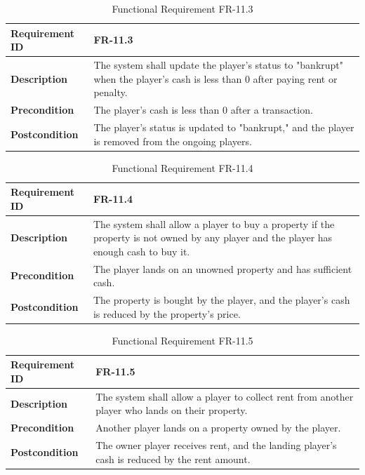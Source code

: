 \documentclass{article}
\begin{document}
\begin{table}[ht]
    \centering
    \caption{Functional Requirement FR-11.3}
    \begin{tabular}{@{}P{3cm}P{12cm}@{}}
        \toprule
        \textbf{Requirement ID} & FR-11.3 \\ \midrule
        \textbf{Description} & The system shall update the player's status to "bankrupt" when the player's cash is less than 0 after paying rent or penalty. \\ \midrule
        \textbf{Precondition} & The player's cash is less than 0 after a transaction. \\ \midrule
        \textbf{Postcondition} & The player's status is updated to "bankrupt," and the player is removed from the ongoing players. \\ \bottomrule
    \end{tabular}
\end{table}

\begin{table}[ht]
    \centering
    \caption{Functional Requirement FR-11.4}
    \begin{tabular}{@{}P{3cm}P{12cm}@{}}
        \toprule
        \textbf{Requirement ID} & FR-11.4 \\ \midrule
        \textbf{Description} & The system shall allow a player to buy a property if the property is not owned by any player and the player has enough cash to buy it. \\ \midrule
        \textbf{Precondition} & The player lands on an unowned property and has sufficient cash. \\ \midrule
        \textbf{Postcondition} & The property is bought by the player, and the player's cash is reduced by the property's price. \\ \bottomrule
    \end{tabular}
\end{table}

\begin{table}[ht]
    \centering
    \caption{Functional Requirement FR-11.5}
    \begin{tabular}{@{}P{3cm}P{12cm}@{}}
        \toprule
        \textbf{Requirement ID} & FR-11.5 \\ \midrule
        \textbf{Description} & The system shall allow a player to collect rent from another player who lands on their property. \\ \midrule
        \textbf{Precondition} & Another player lands on a property owned by the player. \\ \midrule
        \textbf{Postcondition} & The owner player receives rent, and the landing player's cash is reduced by the rent amount. \\ \bottomrule
    \end{tabular}
\end{table}
\end{document}
